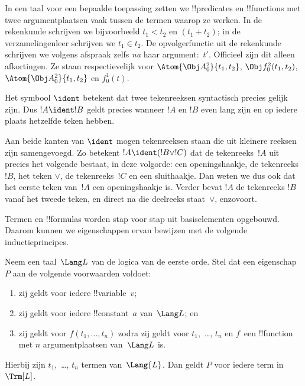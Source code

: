 \documentclass[openany]{memoir}
\begin{document}
In een taal voor een bepaalde toepassing zetten we !!{predicate}s en
!!{function}s met twee argumentplaatsen vaak tussen de termen waarop ze
werken. In de rekenkunde schrijven we bijvoorbeeld $t_1 < t_2$ en
$(t_1 + t_2)$; in de verzamelingenleer schrijven we $t_1 \in t_2$. De
opvolgerfunctie uit de rekenkunde schrijven we volgens afspraak zelfs
\emph{na} haar argument:~$t'$. Officieel zijn dit alleen afkortingen.
Ze staan respectievelijk voor $\Atom{\Obj A^2_0}{t_1, t_2}$,
$\Obj f^2_0(t_1, t_2)$, $\Atom{\Obj A^2_0}{t_1, t_2}$ en $f^1_0(t)$.

\begin{defn}
Het symbool $\ident$ betekent dat twee tekenreeksen syntactisch precies
gelijk zijn. Dus $!A \ident !B$ geldt precies wanneer $!A$ en $!B$
even lang zijn en op iedere plaats hetzelfde teken hebben.
\end{defn}

Aan beide kanten van $\ident$ mogen tekenreeksen staan die uit kleinere
reeksen zijn samengevoegd. Zo betekent $!A \ident (!B \lor !C)$ dat
de tekenreeks~$!A$ uit precies het volgende bestaat, in deze volgorde:
een openingshaakje, de tekenreeks $!B$, het teken $\lor$, de
tekenreeks~$!C$ en een sluithaakje. Dan weten we dus ook dat het eerste
teken van~$!A$ een openingshaakje is. Verder bevat $!A$ de tekenreeks
$!B$ vanaf het tweede teken, en direct na die deelreeks staat~$\lor$,
enzovoort.

Termen en !!{formula}s worden stap voor stap uit basiselementen
opgebouwd. Daarom kunnen we eigenschappen ervan bewijzen met de volgende
inductieprincipes.

\begin{lem}
    Neem een taal~$\Lang L$ van de logica van de eerste orde.
    Stel dat een eigenschap~$P$ aan de volgende voorwaarden voldoet:
    \begin{enumerate}
        \item zij geldt voor iedere !!{variable}~$v$;
        \item zij geldt voor iedere !!{constant}~$a$ van~$\Lang L$; en
        \item zij geldt voor $f(t_1,\dotsc,t_n)$ zodra zij geldt voor
        $t_1$,~\dots, $t_n$ en $f$~een !!{function} met $n$
            argumentplaatsen van~$\Lang L$ is.
    \end{enumerate}
    Hierbij zijn $t_1$,~\dots, $t_n$ termen van~$\Lang{L}$. Dan geldt
    $P$ voor iedere term in~$\Trm[L]$.
\end{lem}
\end{document}
